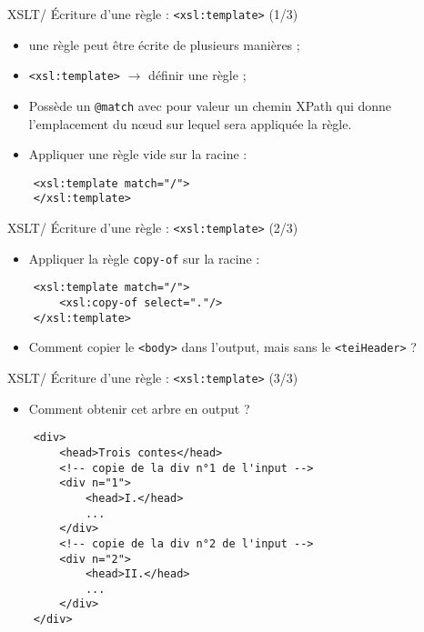\documentclass{beamer}
\begin{document}
    \begin{frame}[fragile]{XSLT/ Écriture d'une règle : \texttt{<xsl:template>} (1/3)}
        \Large
        \begin{itemize}
            \item une règle peut être écrite de plusieurs manières ;
            \bigskip
            \item \texttt{<xsl:template>} $\rightarrow$ définir une règle ;
            \bigskip
            \item Possède un \texttt{@match} avec pour valeur un chemin XPath qui donne l'emplacement du n\oe ud sur lequel sera appliquée la règle.
            \bigskip
            \item Appliquer une règle vide sur la racine :
        \end{itemize}

        \begin{verbatim}
    <xsl:template match="/">
    </xsl:template>
        \end{verbatim}
    \end{frame}

    \begin{frame}[fragile]{XSLT/ Écriture d'une règle : \texttt{<xsl:template>} (2/3)}
        \Large
        \begin{itemize}
            \item Appliquer la règle \texttt{copy-of} sur la racine :
        \end{itemize}

        \begin{verbatim}
    <xsl:template match="/">
        <xsl:copy-of select="."/>
    </xsl:template>
        \end{verbatim}

        \begin{itemize}
            \item Comment copier le \texttt{<body>} dans l'output, mais sans le \texttt{<teiHeader>} ?
        \end{itemize}
    \end{frame}

    \begin{frame}[fragile]{XSLT/ Écriture d'une règle : \texttt{<xsl:template>} (3/3)}
    \Large
        \begin{itemize}
            \item Comment obtenir cet arbre en output ?
        \end{itemize}
        \normalsize
        \begin{verbatim}
    <div>
        <head>Trois contes</head>
        <!-- copie de la div n°1 de l'input -->
        <div n="1">
            <head>I.</head>
            ...
        </div>
        <!-- copie de la div n°2 de l'input -->
        <div n="2">
            <head>II.</head>
            ...
        </div>
    </div>
        \end{verbatim}
        
    \end{frame}
\end{document}
